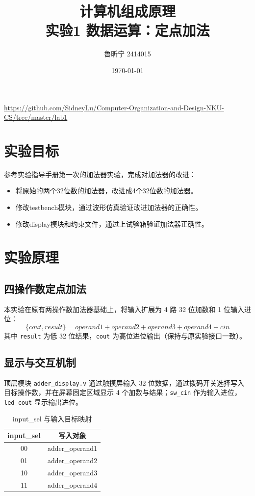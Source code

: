 \documentclass{article}
\title{计算机组成原理 \\ 实验1 数据运算：定点加法}
\author{鲁昕宁 2414015}
\date{\today}
\begin{document}
\maketitle
\begin{center}
    \url{https://github.com/SidneyLu/Computer-Organization-and-Design-NKU-CS/tree/master/lab1}
\end{center}

\newpage

\section{实验目标}
参考实验指导手册第一次的加法器实验，完成对加法器的改进：

\begin{itemize}
\item 将原始的两个32位数的加法器，改进成4个32位数的加法器。
\item 修改testbench模块，通过波形仿真验证改进加法器的正确性。
\item 修改display模块和约束文件，通过上试验箱验证加法器正确性。
\end{itemize}

\section{实验原理}
\subsection{四操作数定点加法}
本实验在原有两操作数加法器基础上，将输入扩展为 4 路 32 位加数和 1 位输入进位：
\[
\{cout,result\}=operand1+operand2+operand3+operand4+cin
\]
其中 \verb|result| 为低 32 位结果，\verb|cout| 为高位进位输出（保持与原实验接口一致）。

\subsection{显示与交互机制}
顶层模块 \verb|adder_display.v| 通过触摸屏输入 32 位数据，通过拨码开关选择写入目标操作数，并在屏幕固定区域显示 4 个加数与结果；\verb|sw_cin| 作为输入进位，\verb|led_cout| 显示输出进位。

\begin{table}[H]
\centering
\caption{input\_sel 与输入目标映射}
\begin{tabular}{c|c}
\toprule
\textbf{input\_sel} & \textbf{写入对象} \\
\midrule
00 & adder\_operand1 \\
01 & adder\_operand2 \\
10 & adder\_operand3 \\
11 & adder\_operand4 \\
\bottomrule
\end{tabular}
\end{table}
\end{document}
